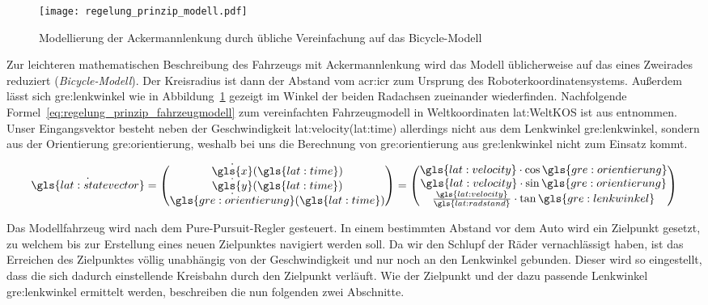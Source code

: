 \begin{figure}[H] %
  \centering
  \texttt{[image: regelung\_prinzip\_modell.pdf]}
  \caption{Modellierung der Ackermannlenkung durch übliche Vereinfachung auf das Bicycle-Modell}
  \label{fig:regelung_prinzip_modell}
\end{figure}

Zur leichteren mathematischen Beschreibung des Fahrzeugs mit Ackermannlenkung wird das Modell üblicherweise auf das eines Zweirades reduziert (\emph{Bicycle-Modell}). Der Kreisradius ist dann der Abstand vom \gls{acr:icr} zum Ursprung des Roboterkoordinatensystems. Außerdem lässt sich \gls{gre:lenkwinkel} wie in Abbildung~\ref{fig:regelung_prinzip_modell} gezeigt im Winkel der beiden Radachsen zueinander wiederfinden. Nachfolgende Formel~\ref{eq:regelung_prinzip_fahrzeugmodell} zum vereinfachten Fahrzeugmodell in Weltkoordinaten \gls{lat:WeltKOS} ist aus \autocite{corkeRoboticsVisionControl2017} entnommen. Unser Eingangsvektor besteht neben der Geschwindigkeit \gls{lat:velocity}(\gls{lat:time}) allerdings nicht aus dem Lenkwinkel \gls{gre:lenkwinkel}, sondern aus der Orientierung \gls{gre:orientierung}, weshalb bei uns die Berechnung von \gls{gre:orientierung} aus \gls{gre:lenkwinkel} nicht zum Einsatz kommt. 

\begin{equation}
\dot{\gls{lat:statevector}} = 
\begin{pmatrix}
\dot{\gls{x}}(\gls{lat:time}) 	\\
\dot{\gls{y}}(\gls{lat:time})	\\
\dot{\gls{gre:orientierung}}(\gls{lat:time})    	\\
\end{pmatrix}
=
\begin{pmatrix}
\gls{lat:velocity} \cdot \cos \gls{gre:orientierung} 	\\
\gls{lat:velocity} \cdot \sin \gls{gre:orientierung} 	\\
\frac{\gls{lat:velocity}}{\gls{lat:radstand}} \cdot \tan \gls{gre:lenkwinkel}    	\\
\end{pmatrix}
\label{eq:regelung_prinzip_fahrzeugmodell}
\end{equation} 

Das Modellfahrzeug wird nach dem \glqq Pure-Pursuit\grqq-Regler gesteuert. In einem bestimmten Abstand vor dem Auto wird ein Zielpunkt gesetzt, zu welchem bis zur Erstellung eines neuen Zielpunktes navigiert werden soll. Da wir den Schlupf der Räder vernachlässigt haben, ist das Erreichen des Zielpunktes völlig unabhängig von der Geschwindigkeit und nur noch an den Lenkwinkel gebunden. Dieser wird so eingestellt, dass die sich dadurch einstellende Kreisbahn durch den Zielpunkt verläuft. Wie der Zielpunkt und der dazu passende Lenkwinkel \gls{gre:lenkwinkel} ermittelt werden, beschreiben die nun folgenden zwei Abschnitte.
